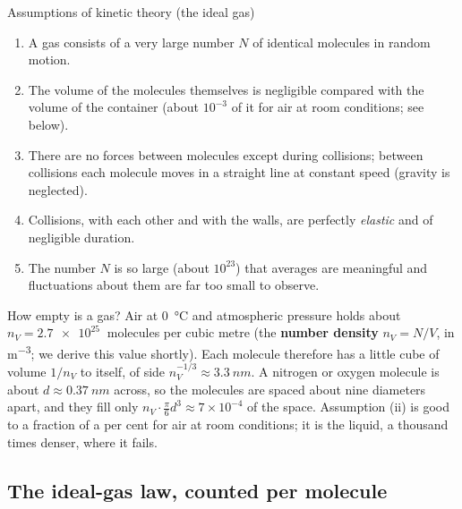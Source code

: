 \begin{defbox}{Assumptions of kinetic theory (the ideal gas)}
\begin{enumerate}[label=\textbf{(\roman*)}]
\item A gas consists of a very large number $N$ of identical molecules in random motion.
\item The volume of the molecules themselves is negligible compared with the volume of the container
      (about $10^{-3}$ of it for air at room conditions; see below).
\item There are no forces between molecules except during collisions; between collisions each molecule
      moves in a straight line at constant speed (gravity is neglected).
\item Collisions, with each other and with the walls, are perfectly \emph{elastic} and of negligible
      duration.
\item The number $N$ is so large (about $10^{23}$) that averages are meaningful and fluctuations about
      them are far too small to observe.
\end{enumerate}
\end{defbox}


How empty is a gas? Air at \SI{0}{\celsius} and atmospheric pressure holds about
$n_V=\SI{2.7e25}{}$ molecules per cubic metre (the \textbf{number density} $n_V=N/V$, in \si{m^{-3}};
we derive this value shortly). Each molecule therefore has a little cube of volume $1/n_V$ to itself, of
side $n_V^{-1/3}\approx\SI{3.3}{nm}$. A nitrogen or oxygen molecule is about $d\approx\SI{0.37}{nm}$
across, so the molecules are spaced about nine diameters apart, and they fill only
$n_V\cdot\tfrac{\pi}{6}d^3\approx7\times10^{-4}$ of the space. Assumption (ii) is good to a fraction of a
per cent for air at room conditions; it is the liquid, a thousand times denser, where it fails.

\subsection{The ideal-gas law, counted per molecule}

